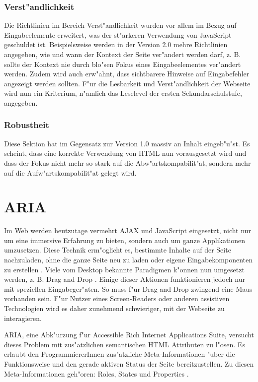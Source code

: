 \documentclass[a4paper,bibtotoc,oneside]{scrbook}
\begin{document}
\subsection{Verst"andlichkeit}
Die Richtlinien im Bereich Verst"andlichkeit wurden vor allem im Bezug auf Eingabeelemente erweitert, was der st"arkeren Verwendung von JavaScript geschuldet ist. Beispielsweise werden in der Version 2.0 mehre Richtlinien angegeben, wie und wann der Kontext der Seite ver"andert werden darf, z. B. sollte der Kontext nie durch blo"sen Fokus eines Eingabeelementes ver"andert werden. Zudem wird auch erw"ahnt, dass sichtbarere Hinweise auf Eingabefehler angezeigt werden sollten. F"ur die Lesbarkeit und Verst"andlichkeit der Webseite wird nun ein Kriterium, n"amlich das Leselevel der ersten Sekundarschulstufe, angegeben.

\subsection{Robustheit}
Diese Sektion hat im Gegensatz zur Version 1.0 massiv an Inhalt eingeb"u"st. Es scheint, dass eine korrekte Verwendung von HTML nun vorausgesetzt wird und dass der Fokus nicht mehr so stark auf die Abw"artskompabilit"at, sondern mehr auf die Aufw"artskompabilit"at gelegt wird.

\chapter{ARIA}
Im Web werden heutzutage vermehrt AJAX und JavaScript eingesetzt, nicht nur um eine immersive Erfahrung zu bieten, sondern auch um ganze Applikationen umzusetzen. Diese Technik erm"oglicht es, bestimmte Inhalte auf der Seite nachzuladen, ohne die ganze Seite neu zu laden oder eigene Eingabekomponenten zu erstellen \cite[S.26]{mod_software}. Viele vom Desktop bekannte Paradigmen k"onnen nun umgesetzt werden, z. B. \glqq Drag and Drop \grqq. Einige dieser Aktionen funktionieren jedoch nur mit speziellen Eingabeger"aten. So muss f"ur Drag and Drop zwingend eine Maus vorhanden sein. F"ur Nutzer eines Screen-Readers oder anderen assistiven Technologien wird es daher zunehmend schwieriger, mit der Webseite zu interagieren. \cite{aria_intro}

ARIA, eine Abk"urzung f"ur Accessible Rich Internet Applications Suite, versucht dieses Problem mit zus"atzlichen semantischen HTML Attributen zu l"osen. Es erlaubt den ProgrammiererInnen zus"atzliche Meta-Informationen "uber die Funktionsweise und den gerade aktiven Status der Seite bereitzustellen. Zu diesen Meta-Informationen geh"oren: Roles, States und Properties \cite{aria_intro}. 
\end{document}
